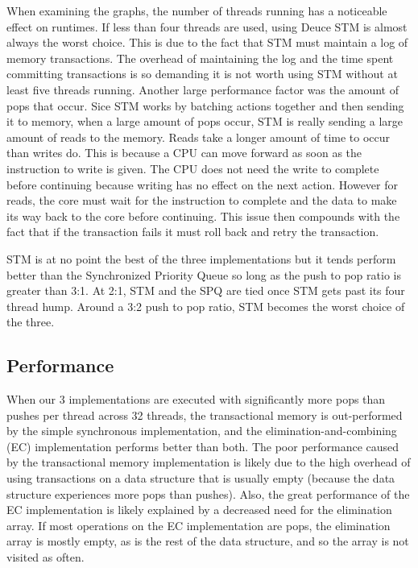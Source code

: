 \documentclass[10pt]{asme2ej}
\begin{document}
When examining the graphs, the number of threads running has a noticeable effect on runtimes. If less than four threads are used, using Deuce STM is almost always the worst choice. This is due to the fact that STM must maintain a log of memory transactions. The overhead of maintaining the log and the time spent committing transactions is so demanding it is not worth using STM without at least five threads running. Another large performance factor was the amount of pops that occur. Sice STM works by batching actions together and then sending it to memory, when a large amount of pops occur, STM is really sending a large amount of reads to the memory. Reads take a longer amount of time to occur than writes do. This is because a CPU can move forward as soon as the instruction to write is given. The CPU does not need the write to complete before continuing because writing has no effect on the next action. However for reads, the core must wait for the instruction to complete and the data to make its way back to the core before continuing. This issue then compounds with the fact that if the transaction fails it must roll back and retry the transaction. 

STM is at no point the best of the three implementations but it tends perform better than the Synchronized Priority Queue so long as the push to pop ratio is greater than 3:1. 
At 2:1, STM and the SPQ are tied once STM gets past its four thread hump. Around a 3:2 push to pop ratio, STM becomes the worst choice of the three.

\subsection{Performance}
When our 3 implementations are executed with significantly more pops than pushes per thread across
32 threads, the transactional memory is out-performed by the simple synchronous implementation, and
the elimination-and-combining (EC) implementation performs better than both. The poor performance
caused by the transactional memory implementation is likely due to the high overhead of using transactions on a data structure that is usually empty (because the data structure experiences more pops than pushes). Also, the great performance of the EC implementation is likely explained by a decreased need for the elimination array. If most operations on the EC implementation are pops, the elimination array is mostly empty, as is the rest of the data structure, and so the array is not visited as often.
\end{document}
